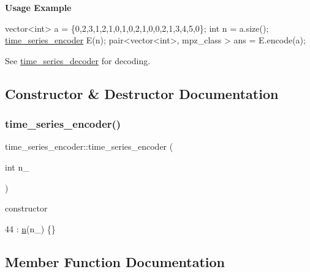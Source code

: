 {\bfseries Usage Example}


\begin{DoxyCode}
vector<int> a = \{0,2,3,1,2,1,0,1,0,2,1,0,0,2,1,3,4,5,0\};
\textcolor{keywordtype}{int} n = a.size();
\hyperlink{classtime__series__encoder}{time\_series\_encoder} E(n);
pair<vector<int>, mpz\_class > ans = E.encode(a);
\end{DoxyCode}


See {\ttfamily \hyperlink{classtime__series__decoder}{time\+\_\+series\+\_\+decoder}} for decoding. 

\subsection{Constructor \& Destructor Documentation}
\mbox{\label{classtime__series__encoder_addf67a97a877de0abe070a5c7d9fa3ec}} 
\subsubsection{\texorpdfstring{time\+\_\+series\+\_\+encoder()}{time\_series\_encoder()}}
{\footnotesize\ttfamily time\+\_\+series\+\_\+encoder\+::time\+\_\+series\+\_\+encoder (\begin{DoxyParamCaption}\item[{int}]{n\+\_\+ }\end{DoxyParamCaption})\hspace{0.3cm}{\ttfamily [inline]}}



constructor 


\begin{DoxyCode}
44 : \hyperlink{classtime__series__encoder_ab84b7528d50c495fc140f1eb50d9b539}{n}(n\_) \{\}
\end{DoxyCode}


\subsection{Member Function Documentation}
\mbox{\label{classtime__series__encoder_a6d3fbf4d839978c6c82efc2160cdc465}} 
